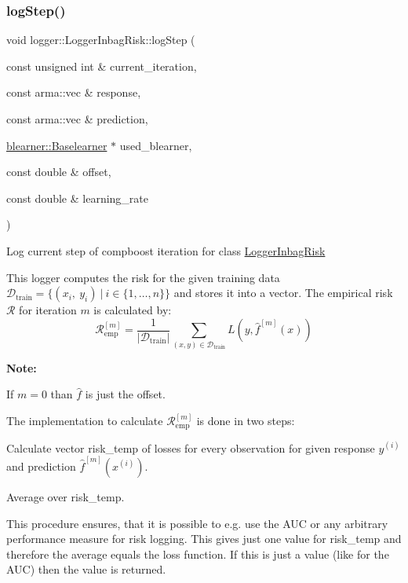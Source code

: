 \subsubsection{\texorpdfstring{log\+Step()}{logStep()}}
{\footnotesize\ttfamily void logger\+::\+Logger\+Inbag\+Risk\+::log\+Step (\begin{DoxyParamCaption}\item[{const unsigned int \&}]{current\+\_\+iteration,  }\item[{const arma\+::vec \&}]{response,  }\item[{const arma\+::vec \&}]{prediction,  }\item[{\hyperlink{classblearner_1_1_baselearner}{blearner\+::\+Baselearner} $\ast$}]{used\+\_\+blearner,  }\item[{const double \&}]{offset,  }\item[{const double \&}]{learning\+\_\+rate }\end{DoxyParamCaption})\hspace{0.3cm}{\ttfamily [virtual]}}



Log current step of compboost iteration for class {\ttfamily \hyperlink{classlogger_1_1_logger_inbag_risk}{Logger\+Inbag\+Risk}} 

This logger computes the risk for the given training data $\mathcal{D}_\mathrm{train} = \{(x_i,\ y_i)\ |\ i \in \{1, \dots, n\}\}$ and stores it into a vector. The empirical risk $\mathcal{R}$ for iteration $m$ is calculated by\+: \[ \mathcal{R}_\mathrm{emp}^{[m]} = \frac{1}{|\mathcal{D}_\mathrm{train}|}\sum\limits_{(x,y) \in \mathcal{D}_\mathrm{train}} L(y, \hat{f}^{[m]}(x)) \]

{\bfseries Note\+:}
\begin{DoxyItemize}
\item If $m=0$ than $\hat{f}$ is just the offset.
\item The implementation to calculate $\mathcal{R}_\mathrm{emp}^{[m]}$ is done in two steps\+:
\begin{DoxyEnumerate}
\item Calculate vector {\ttfamily risk\+\_\+temp} of losses for every observation for given response $y^{(i)}$ and prediction $\hat{f}^{[m]}(x^{(i)})$.
\item Average over {\ttfamily risk\+\_\+temp}.
\end{DoxyEnumerate}

This procedure ensures, that it is possible to e.\+g. use the A\+UC or any arbitrary performance measure for risk logging. This gives just one value for {\ttfamily risk\+\_\+temp} and therefore the average equals the loss function. If this is just a value (like for the A\+UC) then the value is returned.
\end{DoxyItemize}


